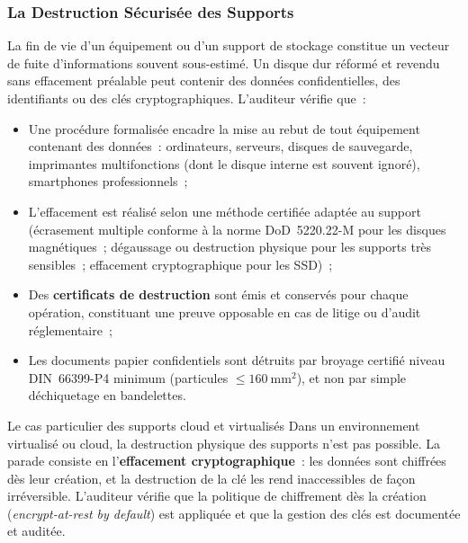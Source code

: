 \subsubsection{La Destruction Sécurisée des Supports}

La fin de vie d'un équipement ou d'un support de stockage constitue un vecteur de
fuite d'informations souvent sous-estimé. Un disque dur réformé et revendu sans
effacement préalable peut contenir des données confidentielles, des identifiants ou
des clés cryptographiques. L'auditeur vérifie que~:

\begin{itemize}
    \item Une procédure formalisée encadre la mise au rebut de tout équipement
        contenant des données~: ordinateurs, serveurs, disques de sauvegarde,
        imprimantes multifonctions (dont le disque interne est souvent ignoré),
        smartphones professionnels~;
    \item L'effacement est réalisé selon une méthode certifiée adaptée au support
        (écrasement multiple conforme à la norme DoD~5220.22-M pour les disques
        magnétiques~; dégaussage ou destruction physique pour les supports très
        sensibles~; effacement cryptographique pour les SSD)~;
    \item Des \textbf{certificats de destruction} sont émis et conservés pour chaque
        opération, constituant une preuve opposable en cas de litige ou d'audit
        réglementaire~;
    \item Les documents papier confidentiels sont détruits par broyage certifié
        niveau DIN~66399-P4 minimum (particules $\leq 160~\text{mm}^2$), et non par
        simple déchiquetage en bandelettes.
\end{itemize}

\begin{boiteRemarque}{Le cas particulier des supports cloud et virtualisés}
Dans un environnement virtualisé ou cloud, la destruction physique des supports
n'est pas possible. La parade consiste en l'\textbf{effacement cryptographique}~:
les données sont chiffrées dès leur création, et la destruction de la clé les rend
inaccessibles de façon irréversible. L'auditeur vérifie que la politique de
chiffrement dès la création (\textit{encrypt-at-rest by default}) est appliquée et
que la gestion des clés est documentée et auditée.
\end{boiteRemarque}

